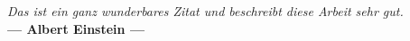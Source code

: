 \pagestyle{empty}
\vspace*{\fill}
\begin{center}
	\huge{
	\glqq
	\textit{Das ist ein ganz wunderbares Zitat und beschreibt diese Arbeit sehr gut.}\grqq\\
	\textbf{--- Albert Einstein ---}
	}
\end{center}

\vfill